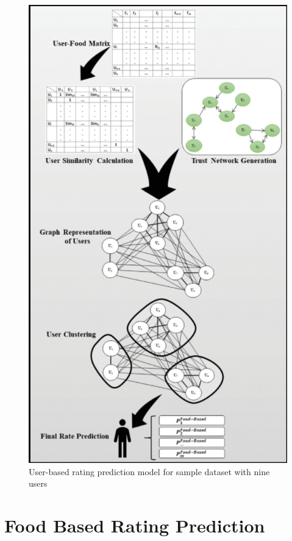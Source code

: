 \begin{figure}[htp]
    \centering
    \includegraphics[scale=0.80]{overall_schema_user_based_rating_prediction.png}
    \caption{User-based rating prediction model for sample dataset with nine users}
    \label{fig:User-based rating prediction model}
\end{figure}


\section{Food Based Rating Prediction}
